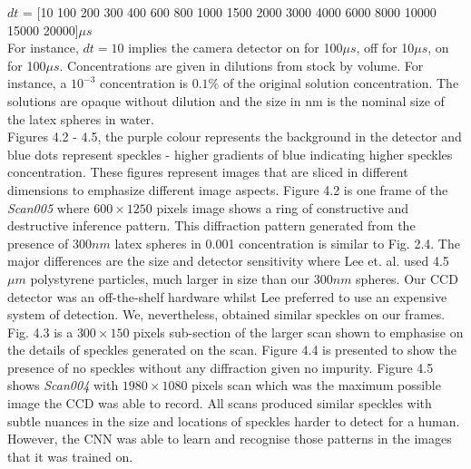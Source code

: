 $dt$ = [10 100 200 300 400 600 800 1000 1500 2000 3000 4000 6000 8000 10000 15000 20000]$\mu s$\\

For instance, $dt = 10$ implies the camera detector on for 100$\mu s$, off for 10$\mu s$, on for 100$\mu s$. Concentrations are given in dilutions from stock by volume.  For instance, a $10^{-3}$ concentration is $0.1\%$ of the original solution concentration. The solutions are opaque without dilution and the size in nm is the nominal size of the latex spheres in water. \\

Figures 4.2 - 4.5, the purple colour represents the background in the detector and blue dots represent speckles - higher gradients of blue indicating higher speckles concentration. These figures represent images that are sliced in different dimensions to emphasize different image aspects. Figure 4.2 is one frame of the \textit{Scan005} where $600\times1250$ pixels image shows a ring of constructive and destructive inference pattern. This diffraction pattern generated from the presence of $300 nm$ latex spheres in 0.001 concentration is similar to Fig. 2.4. The major differences are the size and detector sensitivity where Lee et. al. used 4.5 $\mu m$ polystyrene particles, much larger in size than our $300 nm$ spheres. Our CCD detector was an off-the-shelf hardware whilst Lee preferred to use an expensive system of detection. We, nevertheless, obtained similar speckles on our frames. Fig. 4.3 is a $300\times150$ pixels sub-section of the larger scan shown to emphasise on the details of speckles generated on the scan. Figure 4.4 is presented to show the presence of no speckles without any diffraction given no impurity. Figure 4.5 shows \textit{Scan004} with $1980\times1080$ pixels scan which was the maximum possible image the CCD was able to record. All scans produced similar speckles with subtle nuances in the size and locations of speckles harder to detect for a human. However, the CNN was able to learn and recognise those patterns in the images that it was trained on.\\

